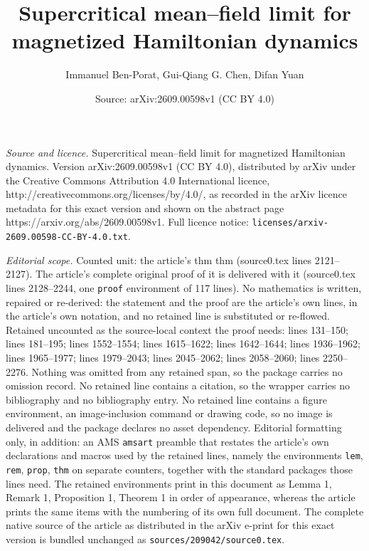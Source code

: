 \documentclass[10pt,a4paper]{amsart}
\title{Supercritical mean--field limit for magnetized Hamiltonian dynamics}
\author{Immanuel Ben-Porat, Gui-Qiang G. Chen, Difan Yuan}
\date{Source: arXiv:2609.00598v1 (CC BY 4.0)}
\begin{document}
\maketitle

\noindent\emph{Source and licence.} Supercritical mean--field limit for magnetized Hamiltonian dynamics. Version arXiv:2609.00598v1 (CC BY 4.0), distributed by arXiv under the Creative Commons Attribution 4.0 International licence, http://creativecommons.org/licenses/by/4.0/, as recorded in the arXiv licence metadata for this exact version and shown on the abstract page https://arxiv.org/abs/2609.00598v1. Full licence notice: \texttt{licenses/arxiv-2609.00598-CC-BY-4.0.txt}.\par\smallskip

\noindent\textit{Editorial scope.} Counted unit: the article's thm thm (source0.tex lines 2121--2127). The article's complete original proof of it is delivered with it (source0.tex lines 2128--2244, one \texttt{proof} environment of 117 lines). No mathematics is written, repaired or re-derived: the statement and the proof are the article's own lines, in the article's own notation, and no retained line is substituted or re-flowed.  Retained uncounted as the source-local context the proof needs: lines 131--150; lines 181--195; lines 1552--1554; lines 1615--1622; lines 1642--1644; lines 1936--1962; lines 1965--1977; lines 1979--2043; lines 2045--2062; lines 2058--2060; lines 2250--2276.  Nothing was omitted from any retained span, so the package carries no omission record.  No retained line contains a citation, so the wrapper carries no bibliography and no bibliography entry.  No retained line contains a figure environment, an image-inclusion command or drawing code, so no image is delivered and the package declares no asset dependency.  Editorial formatting only, in addition: an AMS \texttt{amsart} preamble that restates the article's own declarations and macros used by the retained lines, namely the environments \texttt{lem}, \texttt{rem}, \texttt{prop}, \texttt{thm} on separate counters, together with the standard packages those lines need.  The retained environments print in this document as Lemma 1, Remark 1, Proposition 1, Theorem 1 in order of appearance, whereas the article prints the same items with the numbering of its own full document.  The complete native source of the article as distributed in the arXiv e-print for this exact version is bundled unchanged as \texttt{sources/209042/source0.tex}.
\end{document}
